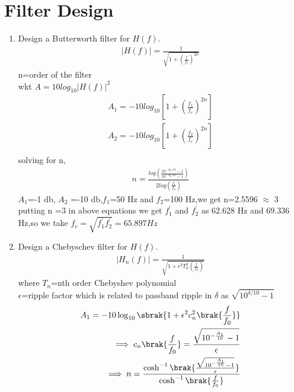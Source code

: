 \documentclass[journal,12pt,twocolumn]{IEEEtran}
\renewcommand\thesection{\arabic{section}}
\begin{document}
\section{Filter Design}
\begin{enumerate}[label=\thesection.\arabic*
,ref=\thesection.\theenumi]
\item Design a Butterworth filter for $H(f)$.
	\solution \begin{align}
		|H(f)|=\frac{1}{\sqrt{1+\left(\frac{f}{f_c}\right)^{2n}}}
	\end{align}
		n=order of the filter\\
		wkt $A=10 log_{10}|H(f)|^2$\\
		\begin{align}
			A_1=-10 log_{10} \left[1+\left(\frac{f_1}{f_c}\right)^{2n}\right]\\
A_2=-10 log_{10} \left[1+\left(\frac{f_2}{f_c}\right)^{2n}\right]\\
		\end{align}
		solving for n,
		\begin{align}
			n=\frac{log\left(\frac{10^{-{A_1}/10}-1}{ 10^{-{A_2}/10}-1}\right)}{2 log \left(\frac{f_1}{f_2}\right)}
		\end{align}
		$A_1$=-1 db, $A_2$ =-10 db,$f_1$=50 Hz and $f_2$=100 Hz,we get n=2.5596 $\approx$ 3 \\
		putting n =3 in above equations we get $f_1^{'}$ and $f_2^{'}$ as 62.628 Hz and 69.336 Hz,so we take $f_c=\sqrt{f_1^{'} f_2^{'}}=65.897 Hz$\\
		\item Design a Chebyschev filter for $H(f)$.\\
	\solution \begin{align}
		|H_n(f)|=\frac{1}{\sqrt{1+\epsilon^{2}T_{n}^2\left(\frac{f}{f_0}\right)}}
	\end{align}
where $T_n$=nth order Chebyshev polynomial\\
		$\epsilon$=ripple factor which is related to passband ripple in $\delta$ as $\sqrt{10^{\delta / 10}-1}$\\
\begin{align}
    A_1 = -10\log_{10}\sbrak{1 + \epsilon^2c_n^2\brak{\frac{f}{f_0}}} \\
    \implies c_n\brak{\frac{f}{f_0}} = \frac{\sqrt{10^{-\frac{A_1}{10}} - 1}}{\epsilon} \\
    \implies n = \frac{\cosh^{-1}\brak{\frac{\sqrt{10^{-\frac{A_1}{10}} - 1}}{\epsilon}}}
    {\cosh^{-1}\brak{\frac{f}{f_0}}}
\end{align}

\end{enumerate}
\end{document}
